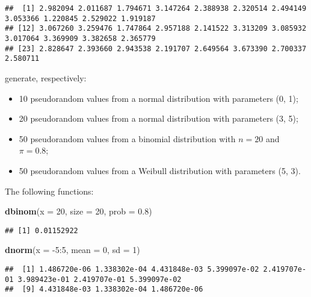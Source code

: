 \documentclass[]{book}
\newenvironment{Shaded}{\begin{snugshade}}{\end{snugshade}}
\newcommand{\KeywordTok}[1]{\textcolor[rgb]{0.13,0.29,0.53}{\textbf{{#1}}}}
\newcommand{\DataTypeTok}[1]{\textcolor[rgb]{0.13,0.29,0.53}{{#1}}}
\newcommand{\DecValTok}[1]{\textcolor[rgb]{0.00,0.00,0.81}{{#1}}}
\newcommand{\FloatTok}[1]{\textcolor[rgb]{0.00,0.00,0.81}{{#1}}}
\newcommand{\NormalTok}[1]{{#1}}
\providecommand{\tightlist}{%
  \setlength{\itemsep}{0pt}\setlength{\parskip}{0pt}}
\def\tightlist{}
\begin{document}
\begin{verbatim}
##  [1] 2.982094 2.011687 1.794671 3.147264 2.388938 2.320514 2.494149 3.053366 1.220845 2.529022 1.919187
## [12] 3.067260 3.259476 1.747864 2.957188 2.141522 3.313209 3.085932 3.017064 3.369909 3.382658 2.365779
## [23] 2.828647 2.393660 2.943538 2.191707 2.649564 3.673390 2.700337 2.580711
\end{verbatim}

generate, respectively:

\begin{itemize}
\tightlist
\item
  10 pseudorandom values from a normal distribution with parameters (0,
  1);
\item
  20 pseudorandom values from a normal distribution with parameters (3,
  5);
\item
  50 pseudorandom values from a binomial distribution with \(n = 20\)
  and \(\pi = 0.8\);
\item
  50 pseudorandom values from a Weibull distribution with parameters (5,
  3).
\end{itemize}

The following functions:

\begin{Shaded}
\begin{Highlighting}[]
\KeywordTok{dbinom}\NormalTok{(}\DataTypeTok{x =} \DecValTok{20}\NormalTok{, }\DataTypeTok{size =} \DecValTok{20}\NormalTok{, }\DataTypeTok{prob =} \FloatTok{0.8}\NormalTok{)}
\end{Highlighting}
\end{Shaded}

\begin{verbatim}
## [1] 0.01152922
\end{verbatim}

\begin{Shaded}
\begin{Highlighting}[]
\KeywordTok{dnorm}\NormalTok{(}\DataTypeTok{x =} \NormalTok{-}\DecValTok{5}\NormalTok{:}\DecValTok{5}\NormalTok{, }\DataTypeTok{mean =} \DecValTok{0}\NormalTok{, }\DataTypeTok{sd =} \DecValTok{1}\NormalTok{)}
\end{Highlighting}
\end{Shaded}

\begin{verbatim}
##  [1] 1.486720e-06 1.338302e-04 4.431848e-03 5.399097e-02 2.419707e-01 3.989423e-01 2.419707e-01 5.399097e-02
##  [9] 4.431848e-03 1.338302e-04 1.486720e-06
\end{verbatim}
\end{document}
